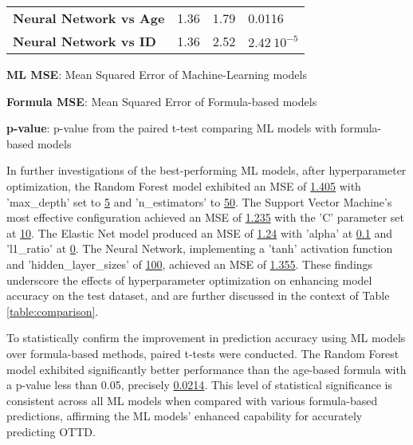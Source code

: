 \documentclass[11pt]{article}
\begin{document}
\begin{table}[h]
\begin{threeparttable}
{\begin{tabular}{llll}
\textbf{Neural Network vs Age} & \raisebox{2ex}{\hypertarget{A10a}{}}1.36 & \raisebox{2ex}{\hypertarget{A10b}{}}1.79 & \raisebox{2ex}{\hypertarget{A10c}{}}0.0116 \\
\textbf{Neural Network vs ID} & \raisebox{2ex}{\hypertarget{A11a}{}}1.36 & \raisebox{2ex}{\hypertarget{A11b}{}}2.52 & \raisebox{2ex}{\hypertarget{A11c}{}}$2.42\ 10^{-5}$ \\
\bottomrule
\end{tabular}}
\begin{tablenotes}
\footnotesize
\item \textbf{ML MSE}: Mean Squared Error of Machine-Learning models
\item \textbf{Formula MSE}: Mean Squared Error of Formula-based models
\item \textbf{p-value}: p-value from the paired t-test comparing ML models with formula-based models
\end{tablenotes}
\end{threeparttable}
\end{table}

In further investigations of the best-performing ML models, after hyperparameter optimization, the Random Forest model exhibited an MSE of \hyperlink{R3c}{1.405} with 'max\_depth' set to \hyperlink{R3a}{5} and 'n\_estimators' to \hyperlink{R3b}{50}. The Support Vector Machine's most effective configuration achieved an MSE of \hyperlink{R5b}{1.235} with the 'C' parameter set at \hyperlink{R5a}{10}. The Elastic Net model produced an MSE of \hyperlink{R4c}{1.24} with 'alpha' at \hyperlink{R4a}{0.1} and 'l1\_ratio' at \hyperlink{R4b}{0}. The Neural Network, implementing a 'tanh' activation function and 'hidden\_layer\_sizes' of \hyperlink{R6a}{100}, achieved an MSE of \hyperlink{R6b}{1.355}. These findings underscore the effects of hyperparameter optimization on enhancing model accuracy on the test dataset, and are further discussed in the context of Table \ref{table:comparison}.

To statistically confirm the improvement in prediction accuracy using ML models over formula-based methods, paired t-tests were conducted. The Random Forest model exhibited significantly better performance than the age-based formula with a p-value less than 0.05, precisely \hyperlink{A1c}{0.0214}. This level of statistical significance is consistent across all ML models when compared with various formula-based predictions, affirming the ML models' enhanced capability for accurately predicting OTTD.
\end{document}
